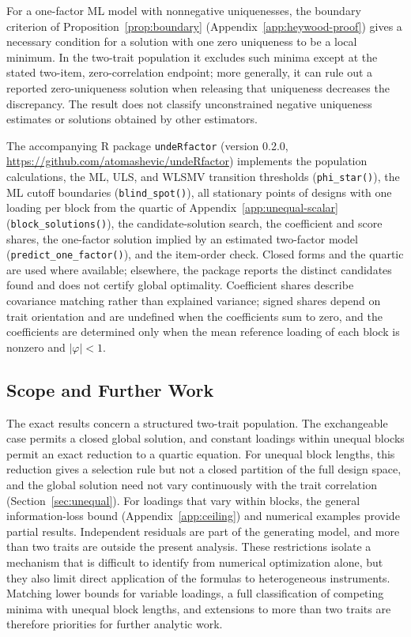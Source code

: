For a one-factor ML model with nonnegative uniquenesses, the boundary criterion of Proposition~\ref{prop:boundary} (Appendix~\ref{app:heywood-proof}) gives a necessary condition for a solution with one zero uniqueness to be a local minimum. In the two-trait population it excludes such minima except at the stated two-item, zero-correlation endpoint; more generally, it can rule out a reported zero-uniqueness solution when releasing that uniqueness decreases the discrepancy. The result does not classify unconstrained negative uniqueness estimates or solutions obtained by other estimators.

The accompanying R package \texttt{undeRfactor} (version 0.2.0, \url{https://github.com/atomashevic/undeRfactor}) implements the population calculations, the ML, ULS, and WLSMV transition thresholds (\texttt{phi\_star()}), the ML cutoff boundaries (\texttt{blind\_spot()}), all stationary points of designs with one loading per block from the quartic of Appendix~\ref{app:unequal-scalar} (\texttt{block\_solutions()}), the candidate-solution search, the coefficient and score shares, the one-factor solution implied by an estimated two-factor model (\texttt{predict\_one\_factor()}), and the item-order check. Closed forms and the quartic are used where available; elsewhere, the package reports the distinct candidates found and does not certify global optimality. Coefficient shares describe covariance matching rather than explained variance; signed shares depend on trait orientation and are undefined when the coefficients sum to zero, and the coefficients are determined only when the mean reference loading of each block is nonzero and $|\varphi|<1$.

\subsection{Scope and Further Work}

The exact results concern a structured two-trait population. The exchangeable case permits a closed global solution, and constant loadings within unequal blocks permit an exact reduction to a quartic equation. For unequal block lengths, this reduction gives a selection rule but not a closed partition of the full design space, and the global solution need not vary continuously with the trait correlation (Section~\ref{sec:unequal}). For loadings that vary within blocks, the general information-loss bound (Appendix~\ref{app:ceiling}) and numerical examples provide partial results. Independent residuals are part of the generating model, and more than two traits are outside the present analysis. These restrictions isolate a mechanism that is difficult to identify from numerical optimization alone, but they also limit direct application of the formulas to heterogeneous instruments. Matching lower bounds for variable loadings, a full classification of competing minima with unequal block lengths, and extensions to more than two traits are therefore priorities for further analytic work.

